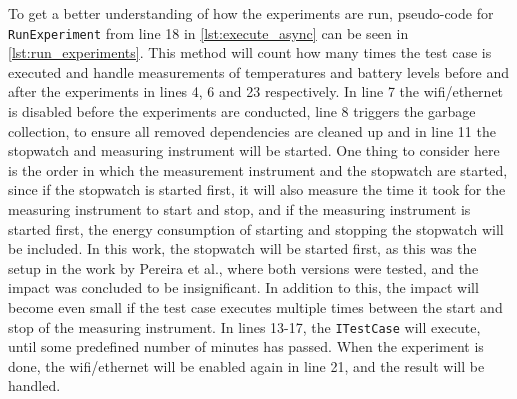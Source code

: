 To get a better understanding of how the experiments are run, pseudo-code for \texttt{RunExperiment} from line 18 in \cref{lst:execute_async} can be seen in \cref{lst:run_experiments}. This method will count how many times the test case is executed and handle measurements of temperatures and battery levels before and after the experiments in lines 4, 6 and 23 respectively. In line 7 the wifi/ethernet is disabled before the experiments are conducted, line 8 triggers the garbage collection, to ensure all removed dependencies are cleaned up and in line 11 the stopwatch and measuring instrument will be started. One thing to consider here is the order in which the measurement instrument and the stopwatch are started, since if the stopwatch is started first, it will also measure the time it took for the measuring instrument to start and stop, and if the measuring instrument is started first, the energy consumption of starting and stopping the stopwatch will be included. In this work, the stopwatch will be started first, as this was the setup in the work by Pereira et al.\cite*[]{Pereira2017}, where both versions were tested, and the impact was concluded to be insignificant. In addition to this, the impact will become even small if the test case executes multiple times between the start and stop of the measuring instrument. In lines 13-17, the \texttt{ITestCase} will execute, until some predefined number of minutes has passed. When the experiment is done, the wifi/ethernet will be enabled again in line 21, and the result will be handled.





